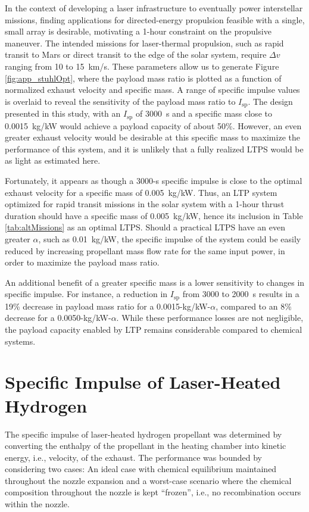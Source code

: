 \documentclass[final,3p,times,twocolumn,sort&compress, lefttitle]{elsarticle}
\begin{document}
            In the context of developing a laser infrastructure to eventually power interstellar missions, finding applications for directed-energy propulsion feasible with a single, small array is desirable, motivating a 1-hour constraint on the propulsive maneuver. The intended missions for laser-thermal propulsion, such as rapid transit to Mars or direct transit to the edge of the solar system, require $\Delta v$ ranging from 10 to 15~km/s. These parameters allow us to generate Figure \ref{fig:app_stuhlOpt}, where the payload mass ratio is plotted as a function of normalized exhaust velocity and specific mass. A range of specific impulse values is overlaid to reveal the sensitivity of the payload mass ratio to $I_\mathrm{sp}$. The design presented in this study, with an $I_\mathrm{sp}$ of 3000~s and a specific mass close to 0.0015~kg/kW would achieve a payload capacity of about 50\%. However, an even greater exhaust velocity would be desirable at this specific mass to maximize the performance of this system, and it is unlikely that a fully realized LTPS would be as light as estimated here.
            
            Fortunately, it appears as though a 3000-s specific impulse is close to the optimal exhaust velocity for a specific mass of 0.005~kg/kW. Thus, an LTP system optimized for rapid transit missions in the solar system with a 1-hour thrust duration should have a specific mass of 0.005~kg/kW, hence its inclusion in Table \ref{tab:altMissions} as an optimal LTPS. Should a practical LTPS have an even greater $\alpha$, such as 0.01~kg/kW, the specific impulse of the system could be easily reduced by increasing propellant mass flow rate for the same input power, in order to maximize the payload mass ratio.
            
            An additional benefit of a greater specific mass is a lower sensitivity to changes in specific impulse. For instance, a reduction in $I_\mathrm{sp}$ from 3000 to 2000~s results in a 19\% decrease in payload mass ratio for a 0.0015-kg/kW-$\alpha$, compared to an 8\% decrease for a 0.0050-kg/kW-$\alpha$. While these performance losses are not negligible, the payload capacity enabled by LTP remains considerable compared to chemical systems.
            
        \section{Specific Impulse of Laser-Heated Hydrogen}
            \label{sec:app_IspCalc}
            The specific impulse of laser-heated hydrogen propellant was determined by converting the enthalpy of the propellant in the heating chamber into kinetic energy, i.e., velocity, of the exhaust. The performance was bounded by considering two cases: An ideal case with chemical equilibrium maintained throughout the nozzle expansion and a worst-case scenario where the chemical composition throughout the nozzle is kept ``frozen'', i.e., no recombination occurs within the nozzle.
            
\end{document}
